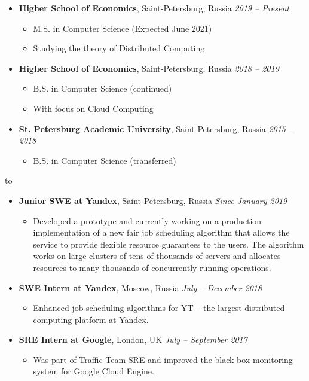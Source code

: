 \documentclass[10pt,a4paper]{extarticle}
\def\tbf{\textbf}
\def\lrg#1{\large\textbf{#1}\normalsize}
\def\headline#1{\medskip\hbox to \hsize{\hrulefill\quad\lower.3em\hbox{\lrg{#1}}\quad\hrulefill}\medskip}
\def\reslist{\vspace{-8pt}\begin{itemize}[label={},leftmargin=*]}
\def\endreslist{\end{itemize}\vspace{-5pt}}
\def\resRaw#1{
  \item #1\normalsize
  \vspace{-5pt}
}
\def\resLocTime#1#2#3{
  \resRaw {
    \tbf{#1}, #2 \hspace*{\fill} \textit{#3}
  }
}
\def\beginres{\begin{itemize}[label=\textbullet]}
\def\endres{\end{itemize}\vspace{-6pt}}
\def\subitem{\item}
\begin{document}
\reslist
  \resLocTime{Higher School of Economics} {Saint-Petersburg, Russia} {2019 -- Present}
  \beginres
    \subitem M.S. in Computer Science (Expected June 2021)
    \subitem Studying the theory of Distributed Computing
  \endres
  \resLocTime{Higher School of Economics} {Saint-Petersburg, Russia} {2018 -- 2019}
  \beginres
    \subitem B.S. in Computer Science (continued)
    \subitem With focus on Cloud Computing
  \endres
  \resLocTime{St. Petersburg Academic University} {Saint-Petersburg, Russia} {2015 -- 2018}
  \beginres
    \subitem B.S. in Computer Science (transferred)
  \endres
\endreslist

\headline{Work Experience}

\reslist
  \resLocTime{Junior SWE at Yandex} {Saint-Petersburg, Russia} {Since January 2019}
  \beginres
    \subitem
      Developed a prototype and currently working on a production implementation of a new
      fair job scheduling algorithm that allows the service to provide flexible resource guarantees to the users.
      The algorithm works on large clusters of tens of thousands of servers and allocates resources to many
      thousands of concurrently running operations.
  \endres

  \resLocTime{SWE Intern at Yandex} {Moscow, Russia} {July -- December 2018}
  \beginres
    \subitem Enhanced job scheduling algorithms for YT -- the largest distributed computing platform at Yandex.
  \endres

  \resLocTime{SRE Intern at Google} {London, UK} {July -- September 2017}
  \beginres
    \subitem Was part of Traffic Team SRE and improved the black box monitoring system for Google Cloud Engine.
  \endres
\endreslist

%
\end{document}
